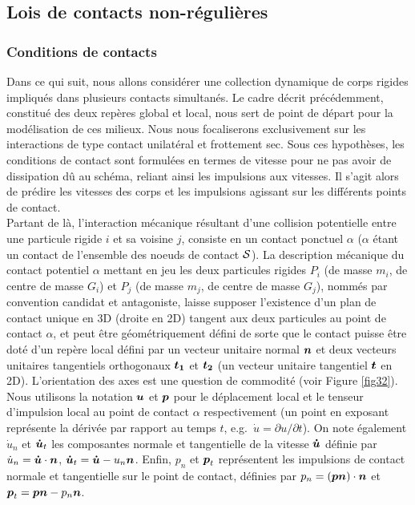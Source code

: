 \subsection{Lois de contacts non-régulières}

\subsubsection{Conditions de contacts}

Dans ce qui suit, nous allons considérer une collection dynamique de corps rigides impliqués dans plusieurs contacts simultanés. Le cadre décrit précédemment, constitué des deux repères global et local, nous sert de point de départ pour la modélisation de ces milieux. Nous nous focaliserons exclusivement sur les interactions de type contact unilatéral et frottement sec. Sous ces hypothèses, les conditions de contact sont formulées en termes de vitesse pour ne pas avoir de dissipation dû au schéma, reliant ainsi les impulsions aux vitesses. Il s'agit alors de prédire les vitesses des corps et les impulsions agissant sur les différents points de contact.\\

Partant de là, l'interaction mécanique résultant d'une collision potentielle entre une particule rigide $i$ et sa voisine $j$, consiste en un contact ponctuel $\alpha$ ($\alpha$ étant un contact de l'ensemble des noeuds de contact $\cal S$). La description mécanique du contact potentiel $\alpha$ mettant en jeu les deux particules rigides $P_i$ (de masse $m_i$, de centre de masse $G_i$) et $P_j$ (de masse $m_j$, de centre de masse $G_j$), nommés par convention candidat et antagoniste, laisse supposer l'existence d'un plan de contact unique en 3D (droite en 2D) tangent aux deux particules au point de contact $\alpha$, et peut être géométriquement défini de sorte que le contact puisse être doté d'un repère local défini par un vecteur unitaire normal $\boldsymbol{n}$ et deux vecteurs unitaires tangentiels orthogonaux $\boldsymbol{t_1}$ et $\boldsymbol{t_2}$ (un vecteur unitaire tangentiel $\boldsymbol{t}$ en 2D). L'orientation des axes est une question de commodité (voir Figure \ref{fig32}). Nous utilisons la notation $\boldsymbol{u}$ et $\boldsymbol{p}$ pour le déplacement local et le tenseur d'impulsion local au point de contact $\alpha$ respectivement (un point en exposant représente la dérivée par rapport au temps $t$, e.g.\ $\dot{u} ={\partial u}/{\partial t}$). On note également $\dot{u}_n$ et $\boldsymbol{\dot{u}}_t$ les composantes normale et tangentielle de la vitesse $\boldsymbol{\dot{u}}$ définie par $\dot{u}_n=\boldsymbol{\dot{u}}\cdot\boldsymbol{n}$, $\boldsymbol{\dot{u}}_t=\boldsymbol{\dot{u}}-u_n\boldsymbol{n}$. Enfin, $p_n$ et $\boldsymbol{p}_t$ représentent les impulsions de contact normale et tangentielle sur le point de contact, définies par $p_n=(\boldsymbol{p}\boldsymbol{n})\cdot\boldsymbol{n}$ et $\boldsymbol{p}_t =
\boldsymbol{p}\boldsymbol{n} - p_n \boldsymbol{n}$.
 
